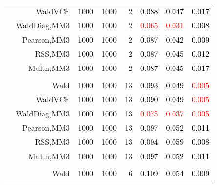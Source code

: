 \documentclass[
]{article}
\begin{document}
\begin{table}[H]
{\begin{tabular}[t]{lrrrrrrr}
\hspace{1em} & WaldVCF & 1000 & 1000 & 2 & \textcolor{black}{0.088} & \textcolor{black}{0.047} & \textcolor{black}{0.017}\\

\hspace{1em} & WaldDiag,MM3 & 1000 & 1000 & 2 & \textcolor{red}{0.065} & \textcolor{red}{0.031} & \textcolor{black}{0.008}\\

\hspace{1em} & Pearson,MM3 & 1000 & 1000 & 2 & \textcolor{black}{0.087} & \textcolor{black}{0.042} & \textcolor{black}{0.009}\\

\hspace{1em} & RSS,MM3 & 1000 & 1000 & 2 & \textcolor{black}{0.087} & \textcolor{black}{0.045} & \textcolor{black}{0.012}\\

\hspace{1em} & Multn,MM3 & 1000 & 1000 & 2 & \textcolor{black}{0.087} & \textcolor{black}{0.045} & \textcolor{black}{0.017}\\
\cmidrule{1-8}
\addlinespace[0.3em]
\multicolumn{8}{l}{\textbf{1F 15V}}\\
\hspace{1em} & Wald & 1000 & 1000 & 13 & \textcolor{black}{0.093} & \textcolor{black}{0.049} & \textcolor{red}{0.005}\\

\hspace{1em} & WaldVCF & 1000 & 1000 & 13 & \textcolor{black}{0.090} & \textcolor{black}{0.049} & \textcolor{red}{0.005}\\

\hspace{1em} & WaldDiag,MM3 & 1000 & 1000 & 13 & \textcolor{red}{0.075} & \textcolor{red}{0.037} & \textcolor{red}{0.005}\\

\hspace{1em} & Pearson,MM3 & 1000 & 1000 & 13 & \textcolor{black}{0.097} & \textcolor{black}{0.052} & \textcolor{black}{0.011}\\

\hspace{1em} & RSS,MM3 & 1000 & 1000 & 13 & \textcolor{black}{0.094} & \textcolor{black}{0.059} & \textcolor{black}{0.008}\\

\hspace{1em} & Multn,MM3 & 1000 & 1000 & 13 & \textcolor{black}{0.097} & \textcolor{black}{0.052} & \textcolor{black}{0.011}\\
\cmidrule{1-8}
\addlinespace[0.3em]
\multicolumn{8}{l}{\textbf{2F 10V}}\\
\hspace{1em} & Wald & 1000 & 1000 & 6 & \textcolor{black}{0.109} & \textcolor{black}{0.054} & \textcolor{black}{0.009}\\


\end{tabular}}
\end{table}
\end{document}
